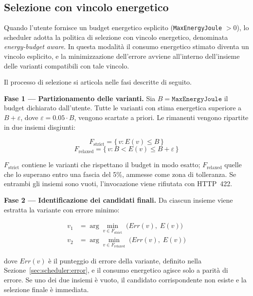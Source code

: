 \subsection{Selezione con vincolo energetico}
\label{sec:scheduler:budget}

Quando l'utente fornisce un budget energetico esplicito
(\texttt{MaxEnergyJoule} $> 0$), lo scheduler adotta la politica di
selezione con vincolo energetico, denominata \textit{energy-budget aware}.
In questa modalità il consumo energetico stimato diventa un vincolo
esplicito, e la minimizzazione dell'errore avviene all'interno
dell'insieme delle varianti compatibili con tale vincolo.

Il processo di selezione si articola nelle fasi descritte di seguito.

\medskip
\noindent\textbf{Fase 1 — Partizionamento delle varianti.}
Sia $B = \texttt{MaxEnergyJoule}$ il budget dichiarato dall'utente.
Tutte le varianti con stima energetica superiore a $B + \varepsilon$,
dove $\varepsilon = 0.05 \cdot B$, vengono scartate a priori.
Le rimanenti vengono ripartite in due insiemi disgiunti:

\begin{equation}
  F_{\text{strict}} = \{\, v : E(v) \leq B \,\}
  \label{eq:f_strict}
\end{equation}
\begin{equation}
  F_{\text{relaxed}} = \{\, v : B < E(v) \leq B + \varepsilon \,\}
  \label{eq:f_relaxed}
\end{equation}

$F_{\text{strict}}$ contiene le varianti che rispettano il budget in modo
esatto; $F_{\text{relaxed}}$ quelle che lo superano entro una fascia del
5\%, ammesse come zona di tolleranza. Se entrambi gli insiemi sono vuoti,
l'invocazione viene rifiutata con HTTP~422.

\medskip
\noindent\textbf{Fase 2 — Identificazione dei candidati finali.}
Da ciascun insieme viene estratta la variante con errore minimo:

\begin{align}
  v_1 &= \arg\min_{v \in F_{\text{strict}}}\; \bigl(\mathit{Err}(v),\; E(v)\bigr)
  \label{eq:v1} \\[4pt]
  v_2 &= \arg\min_{v \in F_{\text{relaxed}}}\; \bigl(\mathit{Err}(v),\; E(v)\bigr)
  \label{eq:v2}
\end{align}

dove $\mathit{Err}(v)$ è il punteggio di errore della variante, definito
nella Sezione~\ref{sec:scheduler:error}, e il consumo energetico agisce
solo a parità di errore. Se uno dei due insiemi è vuoto, il
candidato corrispondente non esiste e la selezione finale è immediata.

